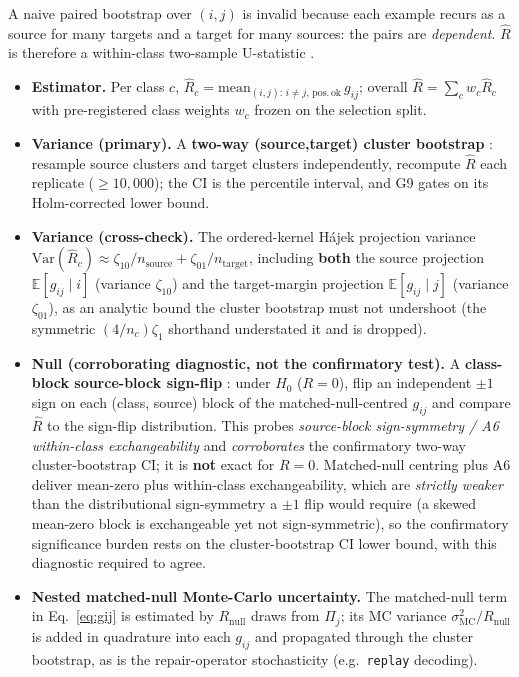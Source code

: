 \documentclass[11pt]{article}
\theoremstyle{plain}
\theoremstyle{definition}
\newcommand{\Rhat}{\widehat{R}}
\newcommand{\Pij}{\Pi_j}
\newcommand{\Eop}{\mathbb{E}}
\begin{document}
A naive paired bootstrap over $(i,j)$ is invalid because each example recurs as a
source for many targets and a target for many sources: the pairs are
\emph{dependent}. $\Rhat$ is therefore a within-class two-sample U-statistic
\cite{hoeffding1948class,lee1990ustatistics}.
\begin{itemize}[leftmargin=1.4em,itemsep=2pt]
  \item \textbf{Estimator.} Per class $c$,
  $\Rhat_c=\mathrm{mean}_{(i,j):\,i\ne j,\,\mathrm{pos.\,ok}}\,g_{ij}$; overall
  $\Rhat=\sum_c w_c\Rhat_c$ with pre-registered class weights $w_c$ frozen on the
  selection split.
  \item \textbf{Variance (primary).} A \textbf{two-way (source,target) cluster
  bootstrap} \cite{cameron2011robust,owen2007pigeonhole}: resample source clusters
  and target clusters independently, recompute $\Rhat$ each replicate
  ($\ge10{,}000$); the CI is the percentile interval, and G9 gates on its
  Holm-corrected lower bound.
  \item \textbf{Variance (cross-check).} The ordered-kernel H\'ajek projection variance
  $\mathrm{Var}(\Rhat_c)\approx\zeta_{10}/n_{\mathrm{source}}+\zeta_{01}/n_{\mathrm{target}}$,
  including \textbf{both} the source projection $\Eop[g_{ij}\mid i]$ (variance
  $\zeta_{10}$) and the target-margin projection $\Eop[g_{ij}\mid j]$ (variance
  $\zeta_{01}$), as an analytic bound the cluster bootstrap must not undershoot (the
  symmetric $(4/n_c)\zeta_1$ shorthand understated it and is dropped).
  \item \textbf{Null (corroborating diagnostic, not the confirmatory test).} A
  \textbf{class-block source-block sign-flip} \cite{good2005permutation}: under $H_0$
  ($R=0$), flip an independent $\pm1$ sign on each (class, source) block of the
  matched-null-centred $g_{ij}$ and compare $\Rhat$ to the sign-flip distribution.
  This probes \emph{source-block sign-symmetry / A6 within-class exchangeability} and
  \emph{corroborates} the confirmatory two-way cluster-bootstrap CI; it is \textbf{not}
  exact for $R=0$. Matched-null centring plus A6 deliver mean-zero plus within-class
  exchangeability, which are \emph{strictly weaker} than the distributional
  sign-symmetry a $\pm1$ flip would require (a skewed mean-zero block is exchangeable
  yet not sign-symmetric), so the confirmatory significance burden rests on the
  cluster-bootstrap CI lower bound, with this diagnostic required to agree.
  \item \textbf{Nested matched-null Monte-Carlo uncertainty.} The matched-null term
  in Eq.~\ref{eq:gij} is estimated by $R_{\mathrm{null}}$ draws from $\Pij$; its MC
  variance $\sigma_{\mathrm{MC}}^2/R_{\mathrm{null}}$ is added in quadrature into each
  $g_{ij}$ and propagated through the cluster bootstrap, as is the repair-operator
  stochasticity (e.g.\ \texttt{replay} decoding).
\end{itemize}
\end{document}
